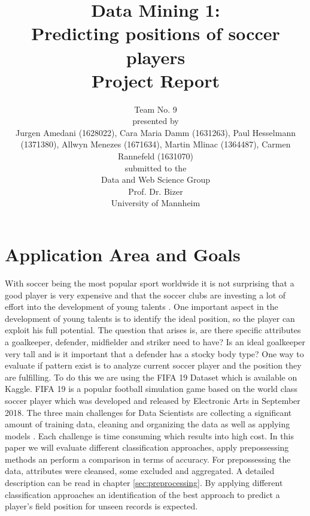 \documentclass[runningheads]{llncs}
\begin{document}
%
\title{Data Mining 1: \\
Predicting positions of soccer players  \\
Project Report}

\vspace{2cm}
\author{Team No. 9\\
\vspace{1cm}
presented by\\
Jurgen Amedani (1628022), Cara Maria Damm (1631263), Paul Hesselmann (1371380), Allwyn Menezes (1671634), Martin Mlinac (1364487), Carmen Rannefeld (1631070)\\
\vspace{1cm}
submitted to the \\
Data and Web Science Group\\
Prof. Dr. Bizer\\
University of Mannheim}

\institute{}
\maketitle
\newpage


\section{Application Area and Goals}
With soccer being the most popular sport worldwide it is not surprising that a good player is very expensive and that the soccer clubs are investing a lot of effort into the development of young talents \cite{ref_Transfermarkt}. One important aspect in the development of young talents is to identify the ideal position, so the player can exploit his full potential.
The question that arises is, are there specific attributes a goalkeeper, defender, midfielder and striker need to have? Is an ideal goalkeeper very tall and is it important that a defender has a stocky body type?\newline
One way to evaluate if pattern exist is to analyze current soccer player and the position they are fulfilling. To do this we are using the FIFA 19 Dataset which is available on Kaggle.\newline
FIFA 19 is a popular football simulation game based on the world class soccer player which was developed and released by Electronic Arts in September 2018. \newline
The three main challenges for Data Scientists are collecting a significant amount of training data, cleaning and organizing the data as well as applying models  \cite{ref_Crowdflower}. Each challenge is time consuming which results into high cost.\newline
In this paper we will evaluate different classification approaches, apply prepossessing methods an perform a comparison in terms of accuracy. For prepossessing the data, attributes were cleansed, some excluded and aggregated. A detailed description can be read in chapter \ref{sec:preprocessing}.
By applying different classification approaches an identification of the best approach to predict a player's field position for unseen records is expected.
\end{document}
